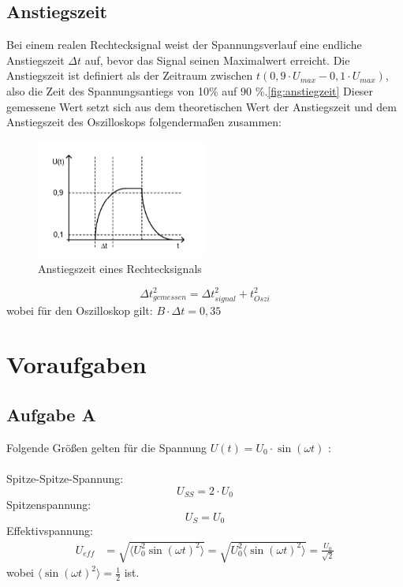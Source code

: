 \documentclass{article}
\begin{document}
\subsection*{Anstiegszeit}
Bei einem realen Rechtecksignal weist der Spannungsverlauf eine endliche Anstiegszeit $\Delta t$
 auf, bevor das Signal seinen Maximalwert erreicht. Die Anstiegszeit ist definiert als der
  Zeitraum zwischen  $t(0,9\cdot U_{max}- 0,1\cdot U_{max})$, also die Zeit des Spannungsantiegs 
  von 10$\%$ auf 90 $\%$.\autoref{fig:anstiegzeit} %
Dieser gemessene Wert setzt sich aus dem theoretischen Wert der Anstiegszeit und dem 
Anstiegszeit des Oszilloskops folgendermaßen zusammen:

\begin{figure}[H]
    \centering
    \includegraphics[width=0.5\textwidth]{figs/Verusch0_Anstiegszeit.png}
    \caption{Anstiegszeit eines Rechtecksignals\cite{anleitung}}
    \label{fig:anstiegzeit}
\end{figure}
\begin{equation}
    \Delta t_{gemessen}^2 = \Delta t_{signal}^2 + t_{Oszi}^2
\end{equation}
wobei für den Oszilloskop gilt: $B \cdot \Delta t = 0,35$
\newpage 

\section{Voraufgaben}

\subsection*{Aufgabe A}
Folgende Größen gelten für die Spannung $U(t)= U_0 \cdot \sin{(\omega t)}$ :\\
\\
Spitze-Spitze-Spannung: \begin{equation}
        U_{SS}= 2 \cdot U_0
    \end{equation}
Spitzenspannung: 
    \begin{equation}
        U_{S}= U_0
    \end{equation}
 Effektivspannung:
    \begin{align*}
        U_{eff} &= \sqrt{ \langle U_0 ^2 \sin{(\omega t)}^2 \rangle}
        = \sqrt{ U_0 ^2 \langle \sin{(\omega t)}^2 \rangle} = \frac{U_0}{\sqrt{2}}
    \end{align*}
wobei $\langle \sin{(\omega t)}^2 \rangle = \frac{1}{2}$ ist.
\end{document}
